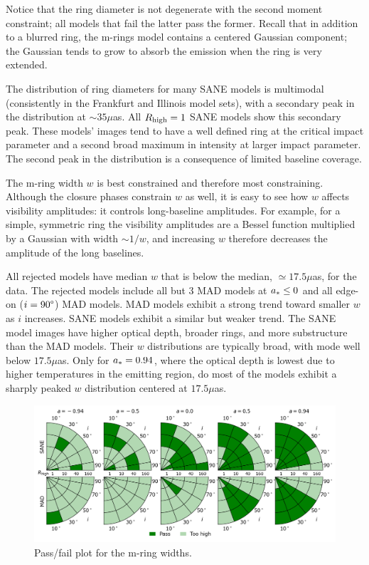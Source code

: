 Notice that the ring diameter is not degenerate with the second moment constraint; all models that fail the latter pass the former.  Recall that in addition to a blurred ring, the m-rings model contains a centered Gaussian component; the Gaussian tends to grow to absorb the emission when the ring is very extended.

The distribution of ring diameters for many SANE models is multimodal (consistently in the Frankfurt and Illinois  model sets), with a secondary peak in the distribution at $\sim 35\mu$as.  All $R_\mathrm{high} = 1$ SANE models show this secondary peak.  These models' images tend to have a well defined ring at the critical impact parameter and a second broad maximum in intensity at larger impact parameter.  The second peak in the distribution is a consequence of limited baseline coverage.


The m-ring width $w$ is best constrained and therefore most constraining.  Although the closure phases constrain $w$ as well, it is easy to see how $w$ affects visibility amplitudes: it controls long-baseline amplitudes.  For example, for a simple, symmetric ring the visibility amplitudes are a Bessel function multiplied by a Gaussian with width $\sim 1/w$, and increasing $w$ therefore decreases the amplitude of the long baselines.

All rejected models have median $w$ that is below the median, $ \simeq 17.5\mu$as, for the data. The rejected models include all but 3 MAD models at $a_* \le 0$ and all edge-on ($i = 90\degree$) MAD models.  MAD models exhibit a strong trend toward smaller $w$ as $i$ increases.  SANE models exhibit a similar but weaker trend. The SANE model images have  higher optical depth, broader rings, and more substructure than the MAD models.  Their $w$ distributions are typically broad, with mode well below $17.5\mu$as.  Only for $a_* = 0.94$, where the optical depth is lowest due to higher temperatures in the emitting region, do most of the models exhibit a sharply peaked $w$ distribution centered at $17.5\mu$as.

\begin{figure}
 \centering
 \includegraphics[width=\textwidth]{./figures/Mring_w_Constraints.png}
  \caption{Pass/fail plot for the m-ring widths.}
\end{figure}

